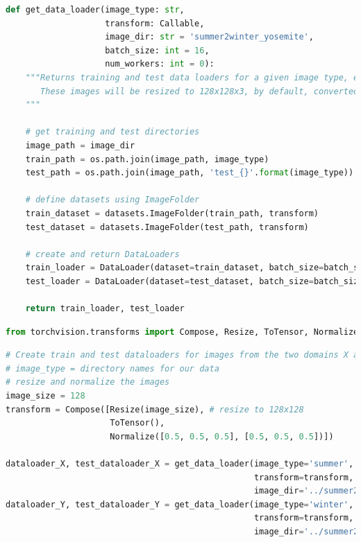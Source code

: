 \begin{lstlisting}[language=Python]
def get_data_loader(image_type: str, 
                    transform: Callable,
                    image_dir: str = 'summer2winter_yosemite', 
                    batch_size: int = 16, 
                    num_workers: int = 0):
    """Returns training and test data loaders for a given image type, either 'summer' or 'winter'. 
       These images will be resized to 128x128x3, by default, converted into Tensors, and normalized.
    """
    
    # get training and test directories
    image_path = image_dir
    train_path = os.path.join(image_path, image_type)
    test_path = os.path.join(image_path, 'test_{}'.format(image_type))

    # define datasets using ImageFolder
    train_dataset = datasets.ImageFolder(train_path, transform)
    test_dataset = datasets.ImageFolder(test_path, transform)

    # create and return DataLoaders
    train_loader = DataLoader(dataset=train_dataset, batch_size=batch_size, shuffle=True, num_workers=num_workers)
    test_loader = DataLoader(dataset=test_dataset, batch_size=batch_size, shuffle=False, num_workers=num_workers)

    return train_loader, test_loader
\end{lstlisting}

\begin{lstlisting}[language=Python]
from torchvision.transforms import Compose, Resize, ToTensor, Normalize 
\end{lstlisting}

\begin{lstlisting}[language=Python]
# Create train and test dataloaders for images from the two domains X and Y
# image_type = directory names for our data
# resize and normalize the images
image_size = 128
transform = Compose([Resize(image_size), # resize to 128x128
                     ToTensor(),
                     Normalize([0.5, 0.5, 0.5], [0.5, 0.5, 0.5])])
    
dataloader_X, test_dataloader_X = get_data_loader(image_type='summer', 
                                                  transform=transform,
                                                  image_dir='../summer2winter_yosemite/',)
dataloader_Y, test_dataloader_Y = get_data_loader(image_type='winter', 
                                                  transform=transform,
                                                  image_dir='../summer2winter_yosemite/',)
\end{lstlisting}

